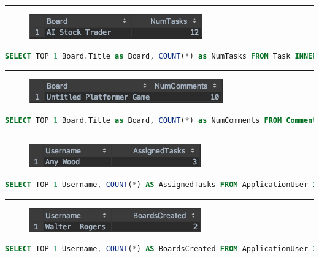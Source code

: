 \documentclass[letterpaper]{article}
\begin{document}
\hrule
\begin{figure}[H]
\centering
\includegraphics[scale=0.5]{Images/MostActiveBoard-Tasks}
\end{figure}
\begin{lstlisting}[language=SQL, caption=Select Most Active Board (Tasks)]
SELECT TOP 1 Board.Title as Board, COUNT(*) as NumTasks FROM Task INNER JOIN List ON Task.ListId = List.Id INNER JOIN Board on List.BoardId = Board.Id GROUP BY Board.Title ORDER BY NumTasks DESC;
\end{lstlisting}
\hrule
\begin{figure}[H]
\centering
\includegraphics[scale=0.5]{Images/MostActiveBoard-Comments}
\end{figure}
\begin{lstlisting}[language=SQL, caption=Select Most Active Board (Comments)]
SELECT TOP 1 Board.Title as Board, COUNT(*) as NumComments FROM Comment INNER JOIN Task on Comment.TaskId = Task.Id INNER JOIN List ON Task.ListId = List.Id INNER JOIN Board on List.BoardId = Board.Id GROUP BY Board.Title ORDER BY NumComments DESC;
\end{lstlisting}
\hrule
\begin{figure}[H]
\centering
\includegraphics[scale=0.5]{Images/MostActiveUser-Tasks}
\end{figure}
\begin{lstlisting}[language=SQL, caption=Select Most Active User (Tasks)]
SELECT TOP 1 Username, COUNT(*) AS AssignedTasks FROM ApplicationUser INNER JOIN TaskAssignee on ApplicationUser.Id = TaskAssignee.AssigneeId GROUP BY Username ORDER BY AssignedTasks DESC;
\end{lstlisting}
\hrule
\begin{figure}[H]
\centering
\includegraphics[scale=0.5]{Images/MostActiveUser-Boards}
\end{figure}
\begin{lstlisting}[language=SQL, caption=Select Most Active User (Boards)]
SELECT TOP 1 Username, COUNT(*) AS BoardsCreated FROM ApplicationUser INNER JOIN Board on ApplicationUser.Id = Board.OwnerId GROUP BY Username ORDER BY BoardsCreated DESC;
\end{lstlisting}
\end{document}
